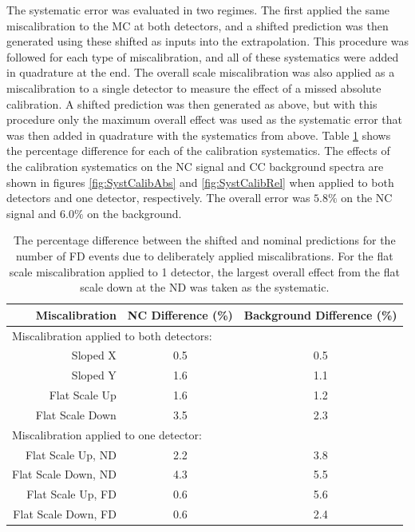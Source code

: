 The systematic error was evaluated in two regimes. The first applied the same miscalibration to the MC at both detectors, and a shifted prediction was then generated using these shifted as inputs into the extrapolation. This procedure was followed for each type of miscalibration, and all of these systematics were added in quadrature at the end. The overall scale miscalibration was also applied as a miscalibration to a single detector to measure the effect of a missed absolute calibration. A shifted prediction was then generated as above, but with this procedure only the maximum overall effect was used as the systematic error that was then added in quadrature with the systematics from above. Table \ref{tab:SystCalib} shows the percentage difference for each of the calibration systematics. The effects of the calibration systematics on the NC signal and CC background spectra are shown in figures \ref{fig:SystCalibAbs} and \ref{fig:SystCalibRel} when applied to both detectors and one detector, respectively. The overall error was $5.8\%$ on the NC signal and $6.0\%$ on the background.
\begin{table}[htb]
  \begin{center}
    \caption[Calibration Systematic Errors]{The percentage difference between the shifted and nominal predictions for the number of FD events due to deliberately applied miscalibrations. For the flat scale miscalibration applied to 1 detector, the largest overall effect from the flat scale down at the ND was taken as the systematic.}
    \label{tab:SystCalib}
    \begin{tabular}{r c c}
      \hline\hline
      Miscalibration & NC Difference (\%) & Background Difference (\%) \\
      \hline
      \multicolumn{3}{l}{Miscalibration applied to both detectors:} \\
      Sloped X & 0.5 & 0.5 \\
      Sloped Y & 1.6 & 1.1 \\
      Flat Scale Up & 1.6 & 1.2 \\
      Flat Scale Down & 3.5 & 2.3 \\
      \multicolumn{3}{l}{Miscalibration applied to one detector:} \\
      Flat Scale Up, ND & 2.2 & 3.8 \\
      Flat Scale Down, ND & 4.3 & 5.5 \\
      Flat Scale Up, FD & 0.6 & 5.6 \\
      Flat Scale Down, FD & 0.6 & 2.4 \\
      \hline
    \end{tabular}
  \end{center}
\end{table}


